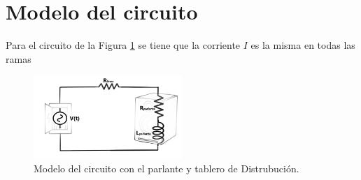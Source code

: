\section{Modelo del circuito}

Para el circuito de la Figura \ref{fig:mi_imagen} se tiene que la corriente $I$ es la misma en todas las ramas
    

\begin{figure}[h] %
    \centering
    \includegraphics[width=0.5\textwidth]{img/Modelo del circuito.png} %
    \caption{Modelo del circuito con el parlante y tablero de Distrubución.}
    \label{fig:mi_imagen}
\end{figure}